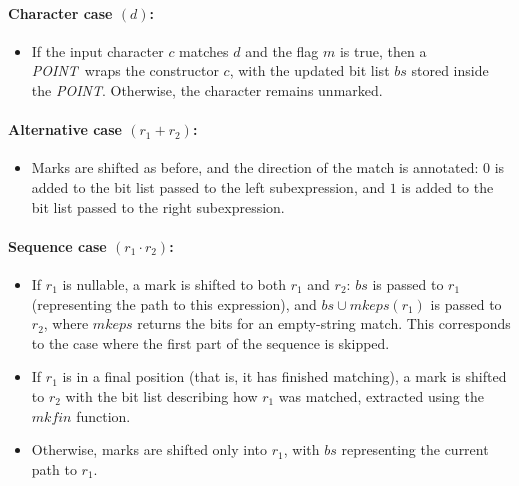 \documentclass[12pt]{article}
\newcommand{\mkeps}{\textit{mkeps}}
\newcommand{\POINT}{\textit{POINT}}
\newcommand{\mkfin}{\textit{mkfin}}
\begin{document}
\paragraph*{\textbf{Character case} $(d)$:}
\begin{itemize}
  \item If the input character $c$ matches $d$ and the flag $m$ is true, then a \POINT\ wraps the constructor $c$, 
        with the updated bit list $bs$ stored inside the \POINT. Otherwise, the character remains unmarked.
\end{itemize}
\paragraph*{\textbf{Alternative case} $(r_1 + r_2)$:}
\begin{itemize}
  \item Marks are shifted as before, and the direction of the match is annotated:  
  $0$ is added to the bit list passed to the left subexpression,  
  and $1$ is added to the bit list passed to the right subexpression.
\end{itemize}
\paragraph*{\textbf{Sequence case} $(r_1 \cdot r_2)$:}
\begin{itemize}
    \item If $r_1$ is nullable, a mark is shifted to both $r_1$ and $r_2$:  
    $bs$ is passed to $r_1$ (representing the path to this expression),  
    and $bs \cup \mkeps(r_1)$ is passed to $r_2$, where $\mkeps$ returns the bits for an empty-string match.  
    This corresponds to the case where the first part of the sequence is skipped.  
    \item If $r_1$ is in a final position (that is, it has finished matching),  
    a mark is shifted to $r_2$ with the bit list describing how $r_1$ was matched,  
    extracted using the $\mkfin$ function.  
    \item Otherwise, marks are shifted only into $r_1$, with $bs$ representing the current path to $r_1$.  
\end{itemize}
\end{document}
